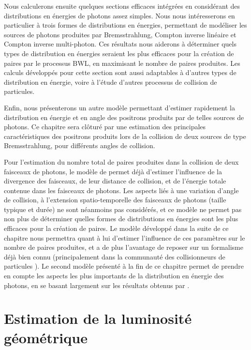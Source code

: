 \begin{refsection}
Nous calculerons ensuite quelques sections efficaces intégrées en considérant des distributions en énergies de photons assez simples. Nous nous intéresserons en particulier à trois formes de distributions en énergies, permettant de modéliser les sources de photons produites par Bremsstrahlung, Compton inverse linéaire et Compton inverse multi-photon. Ces résultats nous aiderons à déterminer quels types de distribution en énergies seraient les plus efficaces pour la création de paires par le processus BWL, en maximisant le nombre de paires produites. Les calculs développés pour cette section sont aussi adaptables à d'autres types de distribution en énergie, voire à l'étude d'autres processus de collision de particules.

Enfin, nous présenterons un autre modèle permettant d'estimer rapidement la distribution en énergie et en angle des positrons produits par de telles sources de photons. Ce chapitre sera clôturé par une estimation des principales caractéristiques des positrons produits lors de la collision de deux sources de type Bremsstrahlung, pour différents angles de collision.

Pour l'estimation du nombre total de paires produites dans la collision de deux faisceaux de photons, le modèle de \cite{ribeyre_2016} permet déjà d'estimer l'influence de la divergence des faisceaux, de leur distance de collision, et de l'énergie totale contenue dans les faisceaux de photons. Les aspects liés à une variation d'angle de collision, à l'extension spatio-temporelle des faisceaux de photons (taille typique et durée) ne sont néanmoins pas considérés, et ce modèle ne permet pas non plus de déterminer quelles formes de distributions en énergies sont les plus efficaces pour la création de paires.
Le modèle développé dans la suite de ce chapitre nous permettra quant à lui d'estimer l'influence de ces paramètres sur le nombre de paires produites, et a de plus l'avantage de reposer sur un formalisme déjà bien connu (principalement dans la communauté des collisionneurs de particules \parencite{herr_2006}). Le second modèle présenté à la fin de ce chapitre permet de prendre en compte les aspects les plus importants de la distribution en énergie des photons, en se basant largement sur les résultats obtenus par \cite{ribeyre_2017}.

\section{Estimation de la luminosité géométrique}


\end{refsection}
